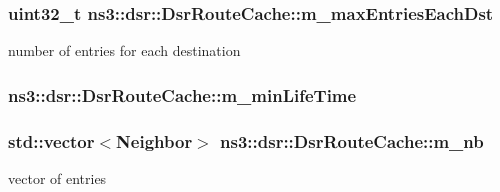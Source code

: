 \subsubsection[{\texorpdfstring{m\+\_\+max\+Entries\+Each\+Dst}{m_maxEntriesEachDst}}]{\setlength{\rightskip}{0pt plus 5cm}uint32\+\_\+t ns3\+::dsr\+::\+Dsr\+Route\+Cache\+::m\+\_\+max\+Entries\+Each\+Dst\hspace{0.3cm}{\ttfamily [private]}}\hypertarget{classns3_1_1dsr_1_1DsrRouteCache_aa6b2bd241ac25da54f0ee83d6a9946be}{}\label{classns3_1_1dsr_1_1DsrRouteCache_aa6b2bd241ac25da54f0ee83d6a9946be}


number of entries for each destination 

\subsubsection[{\texorpdfstring{m\+\_\+min\+Life\+Time}{m_minLifeTime}}]{ ns3\+::dsr\+::\+Dsr\+Route\+Cache\+::m\+\_\+min\+Life\+Time\hspace{0.3cm}{\ttfamily [private]}}\hypertarget{classns3_1_1dsr_1_1DsrRouteCache_ab1fe273b756ac95e21cf000728e33d12}{}\label{classns3_1_1dsr_1_1DsrRouteCache_ab1fe273b756ac95e21cf000728e33d12}
\subsubsection[{\texorpdfstring{m\+\_\+nb}{m_nb}}]{\setlength{\rightskip}{0pt plus 5cm}std\+::vector$<${\bf Neighbor}$>$ ns3\+::dsr\+::\+Dsr\+Route\+Cache\+::m\+\_\+nb}\hypertarget{classns3_1_1dsr_1_1DsrRouteCache_aaab1b839f2609fdb6545124dcde67ea1}{}\label{classns3_1_1dsr_1_1DsrRouteCache_aaab1b839f2609fdb6545124dcde67ea1}


vector of entries 

